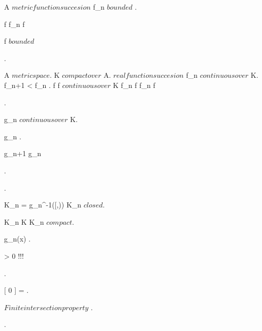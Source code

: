 {	
	{	
	{
		A \subset \R
		 \subset {} $ metric function succesion $ \suchthat {}
		{
			f_n $ bounded $
		}.
		
		f \in {} \suchthat f_n \convergesuniformlyto f

	}
	\holds
	{
		f $ bounded $
	}
	\demonstration
	{
		.

		\all{ \eps \in \R^+ }
		{
		}
	}}



	{
	{
		A $ metric space $.
		K $ compact over $ A.
		 \subset {} $ real function succesion $ \suchthat {}
		{
			f_n $ continuous over $ K.
			f_{n+1} < f_n
		}.
		f \in {} \suchthat f $ continuous over $ K \logicand f_n \convergesto f
	}
	\holds
	{
		f_n \convergesuniformlyto f
	}
	\demonstration
	{
		{
			 \in {}.

			g_n $ continuous over $ K.

			g_n .

			g_{n+1} \leq g_n
		}.

		\all{ \eps \in \R^+ }
		{
			{
				.

				K_n = g_n^{-1}([\eps,\infty)) \imp K_n $ closed $.

				K_n \subset K \imp K_n $ compact $.

				{
				 	g_n(x) \geq \eps.

				 	 \geq \eps > 0 !!!
				}.

				[ 0 ] = \emptyset.

				$Finite intersection property$ \imp .

				\imp {}.

}}}}}
